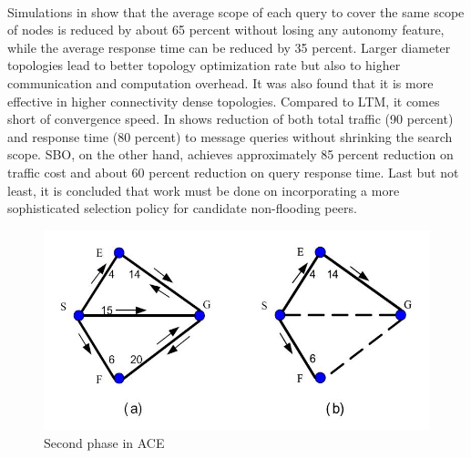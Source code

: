 \documentclass[a4paper,10pt]{article}
\begin{document}
\paragraph{}
Simulations in \cite{liu_acesims_2004} show that the average scope of each query to cover the same scope of nodes is reduced by about 65 percent without losing any autonomy feature, while the average response time can be reduced by 35 percent. Larger diameter topologies lead to better topology optimization rate but also to higher communication and computation overhead. It was also found that it is more effective in higher connectivity dense topologies. Compared to LTM, it comes short of convergence speed. In \cite{ni_mismatch_2004} shows reduction of both total traffic (90 percent) and response time (80 percent) to message queries without shrinking the search scope. SBO, on the other hand, achieves approximately 85 percent reduction on traffic cost and about 60 percent reduction on query response time. Last but not least, it is concluded that work must be done on incorporating a more sophisticated selection policy for candidate non-flooding peers.

\begin{figure}
\centering
  \includegraphics[scale=0.4]{img/ace_phase2.jpeg}
\caption{Second phase in ACE}
\label{figure:ace_phase2}
\end{figure}
\end{document}
